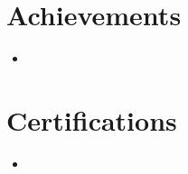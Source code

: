 \documentclass[10pt,letterpaper]{article}
\begin{document}
\section{Achievements}
\begin{itemize}[leftmargin=*, label={--}, itemsep=0pt]
    \item {}
\end{itemize}

\section{Certifications}
\begin{itemize}[leftmargin=*, label={--}, itemsep=0pt]
    \item {}
\end{itemize}
\end{document}

